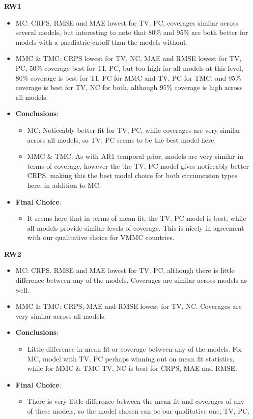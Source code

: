 \documentclass{article}
\begin{document}
\textbf{RW1}

\begin{itemize}
    \item MC: CRPS, RMSE and MAE lowest for TV, PC, coverages similar across several models, but interesting to note that 80\% and 95\% are both better for models with a paediatric cutoff than the models without. 
    \item MMC \& TMC: CRPS lowest for TV, NC, MAE and RMSE lowest for TV, PC, 50\% coverage best for TI, PC, but too high for all models at this level, 80\% coverage is best for TI, PC for MMC and TV, PC for TMC, and 95\% coverage is best for TV, NC for both, although 95\% coverage is high across all models. 
    \item \textbf{Conclusions}: 
    \begin{itemize}
        \item MC: 
        Noticeably better fit for TV, PC, while coverages are very similar across all models, so TV, PC seems to be the best model here. 
        \item MMC \& TMC: As with AR1 temporal prior, models are very similar in terms of coverage, however the the TV, PC model gives noticeably better CRPS, making this the best model choice for both circumcision types here, in addition to MC. 
    \end{itemize}
    \item \textbf{Final Choice}: 
    \begin{itemize}
      \item It seems here that in terms of mean fit, the TV, PC model is best, while all models provide similar levels of coverage. This is nicely in agreement with our qualitative choice for VMMC countries. 
    \end{itemize}
\end{itemize}


\textbf{RW2}

\begin{itemize}
    \item MC: CRPS, RMSE and MAE lowest for TV, PC, although there is little difference between any of the models. Coverages are similar across models as well.
    \item MMC \& TMC: CRPS, MAE and RMSE lowest for TV, NC. Coverages are very similar across all models. 
    \item \textbf{Conclusions}: 
    \begin{itemize}
        \item 
        Little difference in mean fit or coverage between any of the models. For MC, model with TV, PC perhaps winning out on mean fit statistics, while for MMC \& TMC TV, NC is best for CRPS, MAE and RMSE.
    \end{itemize}
    \item \textbf{Final Choice}: 
    \begin{itemize}
      \item There is very little difference between the mean fit and coverages of any of these models, so the model chosen can be our qualitative one, TV, PC. 
    \end{itemize}
\end{itemize}
\end{document}
